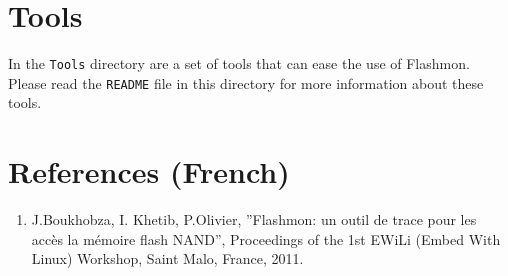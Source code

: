 \documentclass[11pt]{article}
\begin{document}
\section{Tools}
In the \verb+Tools+ directory are a set of tools that can ease the use of Flashmon. Please read the \verb+README+ file in this directory for more information about these tools.

\section{References (French)}
\begin{enumerate}
	\item J.Boukhobza, I. Khetib, P.Olivier, ”Flashmon: un outil de trace pour les acc\`es la m\'emoire flash NAND”, Proceedings of the 1st EWiLi (Embed With Linux) Workshop, Saint Malo, France, 2011.

\end{enumerate}
\end{document}

